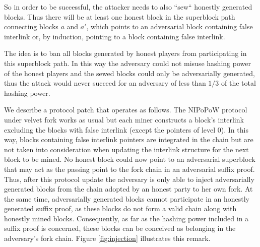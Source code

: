 So in order to be successful, the attacker needs to also ``sew`` honestly generated blocks. Thus there will be at least one honest block in the superblock path connecting blocks $a$ and $a'$, which points to an adversarial block containing false interlink or, by induction, pointing to a block containing false interlink.

The idea is to ban all blocks generated by honest players from participating in this superblock path. In this way the adversary could not misuse hashing power of the honest players and the sewed blocks could only be adversarially generated, thus the attack would never succeed for an adversary of less than $1/3$ of the total hashing power. 

We describe a protocol patch that operates as follows. The NIPoPoW protocol under velvet fork works as usual but each miner constructs a block's interlink excluding the blocks with false interlink (except the pointers of level 0). In this way, blocks containing false interlink pointers are integrated in the chain but are not taken into consideration when updating the interlink structure for the next block to be mined. No honest block could now point to an adversarial superblock that may act as the passing point to the fork chain in an adversarial suffix proof. 
Thus, after this protocol update the adversary is only able to inject adversarially generated blocks from the chain adopted by an honest party to her own fork.
At the same time, adversarially generated blocks cannot participate in an honestly generated suffix proof, as these blocks do not form a valid chain along with honestly mined blocks. Consequently, as far as the hashing power included in a suffix proof is concerned, these blocks can be conceived as belonging in the adversary's fork chain. Figure \ref{fig:injection} illustrates this remark.\\

